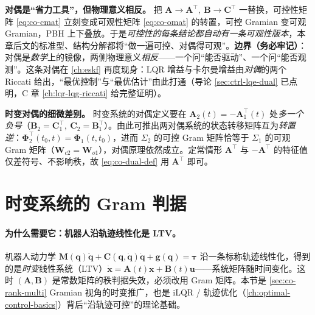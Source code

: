 \begin{insight}
\textbf{对偶是“省力工具”，但物理意义相反。}\;
把 $\mathbf{A}\to\mathbf{A}^\top,\ \mathbf{B}\to\mathbf{C}^\top$ 一替换，可控性矩阵 \cref{eq:co-cmat} 立刻变成可观性矩阵 \cref{eq:co-omat} 的转置，可控 Gramian 变可观 Gramian，PBH 上下叠放。于是\emph{可控性的每条结论都自动有一条可观性版本}，本章后文的标准型、结构分解都将“做一遍可控、对偶得可观”。\textbf{边界（务必牢记）}：对偶是\emph{数学}上的镜像，两侧物理意义\emph{相反}——一个问“能否驱动”、一个问“能否观测”。这条对偶在 \cref{ch:eskf} 再度现身：LQR 增益与卡尔曼增益由\emph{对偶}的两个 Riccati 给出，“最优控制”与“最优估计”由此打通（导论 \cref{sec:ctrl-lqe-dual} 已点明，C 章 \cref{ch:lqr-lqg-riccati} 给完整证明）。
\end{insight}

\begin{note}
\textbf{时变对偶的细微差别。}\;
时变系统的对偶定义要在 $\mathbf{A}_2(t)=-\mathbf{A}_1^\top(t)$ 处\emph{多一个负号}（$\mathbf{B}_2=\mathbf{C}_1^\top,\ \mathbf{C}_2=\mathbf{B}_1^\top$）。由此可推出两对偶系统的状态转移矩阵互为\emph{转置逆}：$\boldsymbol{\Phi}_2^\top(t_0,t)=\boldsymbol{\Phi}_1(t,t_0)$，进而 $\Sigma_2$ 的可控 Gram 矩阵恰等于 $\Sigma_1$ 的可观 Gram 矩阵（$\mathbf{W}_{c2}=\mathbf{W}_{o1}$），对偶原理依然成立\cite{liubao2006modern}。定常情形 $\mathbf{A}^\top$ 与 $-\mathbf{A}^\top$ 的特征值仅差符号、不影响秩，故 \cref{eq:co-dual-def} 用 $\mathbf{A}^\top$ 即可。
\end{note}

\section{时变系统的 Gram 判据}
\label{sec:co-timevarying}

\paragraph{为什么需要它：机器人沿轨迹线性化是 LTV。}
机器人动力学 $\mathbf{M}(\mathbf{q})\ddot{\mathbf{q}}+\mathbf{C}(\mathbf{q},\dot{\mathbf{q}})\dot{\mathbf{q}}+\mathbf{g}(\mathbf{q})=\boldsymbol{\tau}$ 沿一条标称轨迹线性化，得到的是\emph{时变}线性系统（LTV）$\dot{\mathbf{x}}=\mathbf{A}(t)\mathbf{x}+\mathbf{B}(t)\mathbf{u}$——系统矩阵随时间变化。这时 $(\mathbf{A},\mathbf{B})$ 是常数矩阵的秩判据失效，必须改用 Gram 矩阵\cite{liubao2006modern,zhang2017modern}。本节是 \cref{sec:co-rank-multi} Gramian 视角的时变推广，也是 iLQR / 轨迹优化（\cref{ch:optimal-control-basics}）背后“沿轨迹可控”的理论基础。

